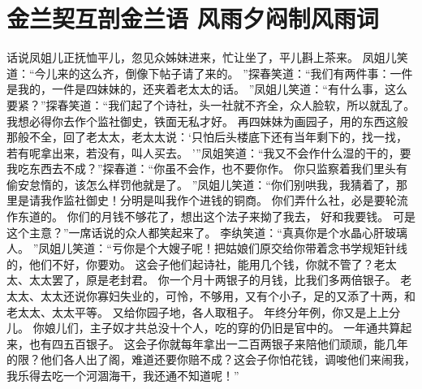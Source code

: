 \chapter{金兰契互剖金兰语 \quad 风雨夕闷制风雨词}
\par
{}\par
话说凤姐儿正抚恤平儿，忽见众姊妹进来，忙让坐了，平儿斟上茶来。
凤姐儿笑道：“今儿来的这么齐，倒像下帖子请了来的。
”探春笑道：“我们有两件事：一件是我的，一件是四妹妹的，还夹着老太太的话。
”凤姐儿笑道：“有什么事，这么要紧？”探春笑道：“我们起了个诗社，头一社就不齐全，众人脸软，所以就乱了。
我想必得你去作个监社御史，铁面无私才好。
再四妹妹为画园子，用的东西这般那般不全，回了老太太，老太太说：‘只怕后头楼底下还有当年剩下的，找一找，若有呢拿出来，若没有，叫人买去。
’”凤姐笑道：“我又不会作什么湿的干的，要我吃东西去不成？”探春道：“你虽不会作，也不要你作。
你只监察着我们里头有偷安怠惰的，该怎么样罚他就是了。
”凤姐儿笑道：“你们别哄我，我猜着了，那里是请我作监社御史！分明是叫我作个进钱的铜商。
你们弄什么社，必是要轮流作东道的。
你们的月钱不够花了，想出这个法子来拗了我去，
好和我要钱。
可是这个主意？”一席话说的众人都笑起来了。
李纨笑道：“真真你是个水晶心肝玻璃人。
”凤姐儿笑道：“亏你是个大嫂子呢！把姑娘们原交给你带着念书学规矩针线的，他们不好，你要劝。
这会子他们起诗社，能用几个钱，你就不管了？老太太、太太罢了，原是老封君。
你一个月十两银子的月钱，比我们多两倍银子。
老太太、太太还说你寡妇失业的，可怜，不够用，又有个小子，足的又添了十两，和老太太、太太平等。
又给你园子地，各人取租子。
年终分年例，你又是上上分儿。
你娘儿们，主子奴才共总没十个人，吃的穿的仍旧是官中的。
一年通共算起来，也有四五百银子。
这会子你就每年拿出一二百两银子来陪他们顽顽，能几年的限？他们各人出了阁，难道还要你赔不成？这会子你怕花钱，调唆他们来闹我，我乐得去吃一个河涸海干，我还通不知道呢！”\par
